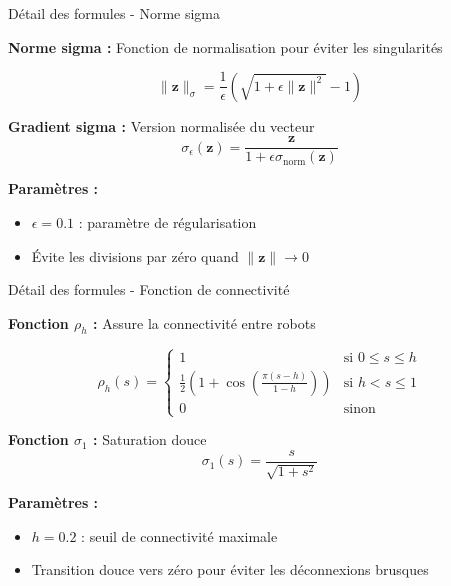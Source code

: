 \begin{frame}{Détail des formules - Norme sigma}

\textbf{Norme sigma :} Fonction de normalisation pour éviter les singularités

\begin{equation}
\|\mathbf{z}\|_\sigma = \frac{1}{\epsilon} \left( \sqrt{1 + \epsilon \|\mathbf{z}\|^2} - 1 \right)
\end{equation}

\textbf{Gradient sigma :} Version normalisée du vecteur
\begin{equation}
\sigma_\epsilon(\mathbf{z}) = \frac{\mathbf{z}}{1 + \epsilon \sigma_{\text{norm}}(\mathbf{z})}
\end{equation}

\textbf{Paramètres :}
\begin{itemize}
\item $\epsilon = 0.1$ : paramètre de régularisation
\item Évite les divisions par zéro quand $\|\mathbf{z}\| \rightarrow 0$
\end{itemize}

\end{frame}

\begin{frame}{Détail des formules - Fonction de connectivité}

\textbf{Fonction $\rho_h$ :} Assure la connectivité entre robots

\begin{equation}
\rho_h(s) = \begin{cases}
1 & \text{si } 0 \leq s \leq h \\
\frac{1}{2}\left(1 + \cos\left(\frac{\pi(s-h)}{1-h}\right)\right) & \text{si } h < s \leq 1 \\
0 & \text{sinon}
\end{cases}
\end{equation}

\textbf{Fonction $\sigma_1$ :} Saturation douce
\begin{equation}
\sigma_1(s) = \frac{s}{\sqrt{1 + s^2}}
\end{equation}

\textbf{Paramètres :}
\begin{itemize}
\item $h = 0.2$ : seuil de connectivité maximale
\item Transition douce vers zéro pour éviter les déconnexions brusques
\end{itemize}

\end{frame}

